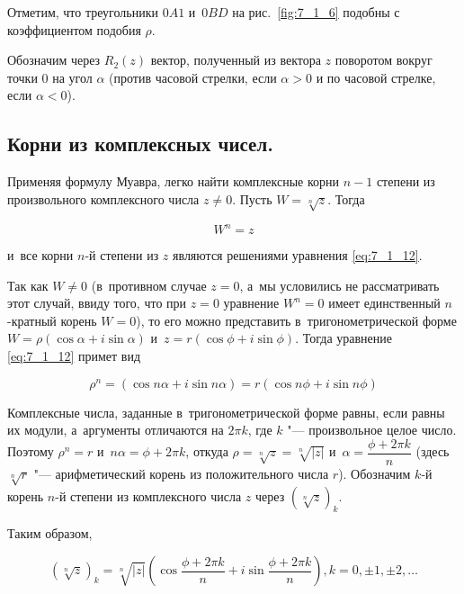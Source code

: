 Отметим, что треугольники $0A1$ и~$0BD$ на рис.\ \ref{fig:7_1_6} подобны с коэффициентом
подобия $\rho$.

Обозначим через $R_{2}(z)$ вектор, полученный из вектора $z$ поворотом вокруг точки $0$
на угол $\alpha$ (против часовой стрелки, если $\alpha > 0$ и по часовой стрелке,
если $\alpha < 0$).


\subsection{Корни из комплексных чисел.}
Применяя формулу Муавра, легко найти комплексные корни $n-1$ степени из произвольного
комплексного числа $z \ne 0$. Пусть $W = \sqrt[\scriptstyle n]{z}$. Тогда

\begin{equation}\label{eq:7_1_12}
W^{n} = z
\end{equation}

\noindent
и~все корни $n$-й степени из $z$ являются решениями уравнения \eqref{eq:7_1_12}.

Так как $W \ne 0$ (в~противном случае $z = 0$, а~мы условились не рассматривать
этот случай, ввиду того, что при $z = 0$ уравнение $W^{n} = 0$ имеет единственный
$n$-кратный корень $W = 0$), то его можно представить в~тригонометрической форме
$W = \rho (\cos \alpha + i\sin \alpha)$ и~$z = r(\cos \phi + i \sin \phi)$.
Тогда уравнение \eqref{eq:7_1_12} примет вид

\begin{equation}\label{eq:7_1_13}
\rho^{n} = (\cos n\alpha + i\sin n\alpha) = r(\cos n\phi + i\sin n\phi) 
\end{equation}

\noindent
Комплексные числа, заданные в~тригонометрической форме равны, если равны их модули,
а~аргументы отличаются на $2\pi k$, где $k$ "--- произвольное целое число.
Поэтому $\rho^{n} = r$ и~$n\alpha = \phi + 2\pi k$, откуда
$\rho = \sqrt[\scriptstyle n]{z} = \sqrt[\scriptstyle n]{|z|}$ и~$\alpha = \dfrac{\phi + 2\pi k}{n}$
(здесь $\sqrt[\scriptstyle n]{r}$ "--- арифметический корень из положительного числа $r$).
Обозначим $k$-й корень $n$-й степени из комплексного числа $z$ через
$\left( \sqrt[\scriptstyle n]{z}\right)_{k}$.

Таким образом,

\begin{equation}\label{eq:7_1_14}
\left( \sqrt[\scriptstyle n]{z}\right)_{k} =
\sqrt[\scriptstyle n]{|z|}
    \left(
         \cos \dfrac{\phi + 2\pi k}{n} + i \sin \dfrac{\phi + 2\pi k}{n}
    \right),
k = 0,\pm 1, \pm 2, \dots
\end{equation}

